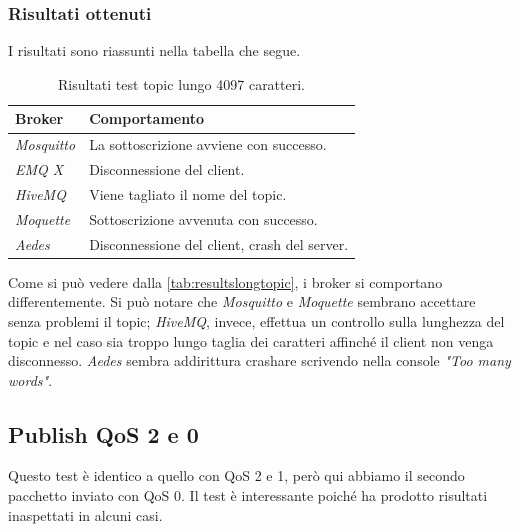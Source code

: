\documentclass[binding=0.6cm,TFA]{sapthesis}
\begin{document}
\begin{large}
\subsubsection{Risultati ottenuti}
I risultati sono riassunti nella tabella che segue.
\begin{table}[h]
\caption{Risultati test topic lungo 4097 caratteri.}
\label{tab:resultslongtopic}
\begin{tabular}{lp{}}
\toprule
\textbf{Broker} & \textbf{Comportamento} \\
\midrule
\textit{Mosquitto} & La sottoscrizione avviene con successo. \\
\textit{EMQ X} & Disconnessione del client. \\
\textit{HiveMQ} & Viene tagliato il nome del topic. \\
\textit{Moquette} & Sottoscrizione avvenuta con successo.\\
\textit{Aedes} & Disconnessione del client, crash del server. \\
\bottomrule
\end{tabular}
\end{table}

Come si può vedere dalla \autoref{tab:resultslongtopic}, i broker si comportano differentemente. Si può notare che \textit{Mosquitto} e \textit{Moquette} sembrano accettare senza problemi il topic; \textit{HiveMQ}, invece, effettua un controllo sulla lunghezza del topic e nel caso sia troppo lungo taglia dei caratteri affinché il client non venga disconnesso. \textit{Aedes} sembra addirittura crashare scrivendo nella console \textit{"Too many words"}.

\subsection{Publish QoS 2 e 0}
\begin{python}
\end{python}
Questo test è identico a quello con QoS 2 e 1, però qui abbiamo il secondo pacchetto inviato con QoS 0. Il test è interessante poiché ha prodotto risultati inaspettati in alcuni casi.


\end{large}
\end{document}
